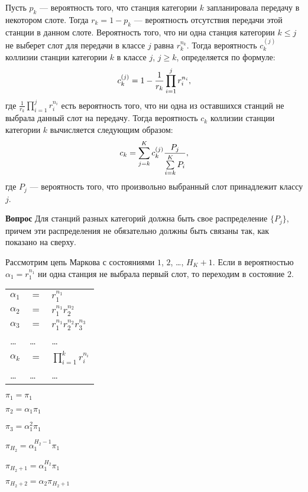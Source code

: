 Пусть $p_k$ --- вероятность того, что станция категории $k$ запланировала передачу в некотором слоте. Тогда $r_k = 1 - p_k$ --- вероятность отсутствия передачи этой станции в данном слоте. Вероятность того, что ни одна станция категории $k \leqslant j$ не выберет слот для передачи в классе $j$ равна $r_k^{n_k}$. Тогда вероятность
$c_k^{(j)}$ коллизии станции категории $k$ в классе $j$, $j \geqslant k$, определяется по формуле:
\begin{equation}
\notag
c_k^{(j)} = 1 - \frac{1}{r_k}\prod\limits_{i = 1}^{j} r_i^{n_i},
\end{equation} 
где $\frac{1}{r_k}\prod\limits_{i = 1}^{j} r_i^{n_i}$ есть вероятность того, что ни одна из оставшихся станций не выбрала данный слот на передачу.
Тогда вероятность $c_k$ коллизии станции категории $k$ вычисляется следующим образом:
\begin{equation}
\notag
c_k = \sum\limits_{j = k}^{K} c_k^{(j)} \frac{P_j}{\sum\limits_{i = k}^{K} P_i}, 
\end{equation}
где $P_j$ --- вероятность того, что произвольно выбранный слот принадлежит классу $j$.

\textbf{Вопрос} Для станций разных категорий должна быть свое распределение $\{P_j\}$, причем эти распределения не обязательно должны быть связаны так, как показано на сверху.


Рассмотрим цепь Маркова с состояниями $1$, $2$, \dots, $H_K+1$.
Если в вероятностью $\alpha_1 = r_1^{n_1}$ ни одна станция не выбрала первый слот, то переходим в состояние $2$. 

\begin{tabular}{l l l}
$\alpha_1$  &$=$ &$r_1^{n_1}$  \\
$\alpha_2$	&$=$ &$r_1^{n_1}r_2^{n_2}$ \\
$\alpha_3$	&$=$ &$r_1^{n_1}r_2^{n_2}r_3^{n_3}$ \\
\dots	&\dots	&\dots \\
$\alpha_k$	&$=$ &$\prod\limits_{i = 1}^{k} r_i^{n_i}$ \\
\dots	&\dots	&\dots \\
\end{tabular}

$\pi_1 = \pi_1$

$\pi_2 = \alpha_1 \pi_1$

$\pi_3 = \alpha_1^2 \pi_1$

$\pi_{H_2} = \alpha_1^{H_2-1} \pi_1$

$\pi_{H_2+1} = \alpha_1^{H_2} \pi_1$

$\pi_{H_2+2} = \alpha_2 \pi_{H_2+1}$

